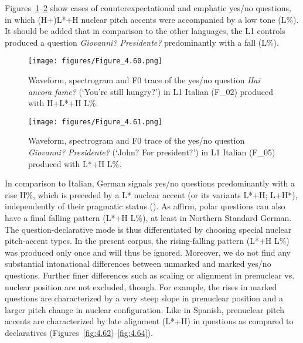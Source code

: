 Figures~\ref{fig:4.60}--\ref{fig:4.61} show cases of counterexpectational and emphatic yes/no questions, in which (H+)L*+H nuclear pitch accents were accompanied by a low tone (L\%). It should be added that in comparison to the other languages, the L1 controls produced a question \textit{Giovanni? Presidente?} predominantly with a fall (L\%).

\begin{figure}


\texttt{[image: figures/Figure\_4.60.png]}



\caption{Waveform, spectrogram and F0 trace of the yes/no question \textit{Hai ancora fame?} (‘You’re still hungry?’) in L1 Italian (F\_02) produced with H+L*+H L\%.}
\label{fig:4.60}
\end{figure}

\begin{figure}


\texttt{[image: figures/Figure\_4.61.png]}



\caption{Waveform, spectrogram and F0 trace of the yes/no question \textit{Giovanni? Presidente?} (‘John? For president?’) in L1 Italian (F\_05) produced with L*+H L\%.}
\label{fig:4.61}
\end{figure}


In comparison to Italian, German signals yes/no questions predominantly with a rise H\%, which is preceded by a L* nuclear accent (or its variants L*+H; L+H*), independently of their pragmatic status (\citealt{Féry1993, GriceBaumann2002, Kügler2003, Michalsky2017, BraunEtAl2018}). As \citet{PetroneNiebuhr2014} affirm, polar questions can also have a final falling pattern (L*+H L\%), at least in Northern Standard German. The question-declarative mode is thus differentiated by choosing special nuclear pitch-accent types. In the present corpus, the rising-falling pattern (L*+H L\%) was produced only once and will thus be ignored. Moreover, we do not find any substantial intonational differences between unmarked and marked yes/no questions. Further finer differences such as scaling or alignment in prenuclear vs. nuclear position are not excluded, though. For example, the rises in marked questions are characterized by a very steep slope in prenuclear position and a larger pitch change in nuclear configuration. Like in Spanish, prenuclear pitch accents are characterized by late alignment (L*+H) in questions as compared to declaratives (Figures~\ref{fig:4.62}--\ref{fig:4.64}).


